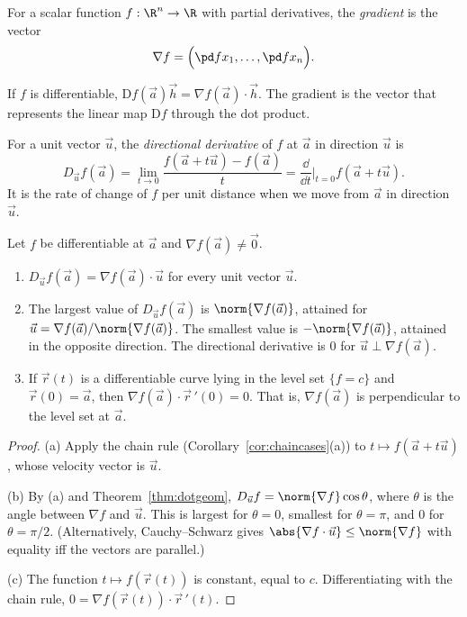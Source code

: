 \begin{definition}[Gradient]
For a scalar function $f:\R^n\to\R$ with partial derivatives, the \emph{gradient} is the vector
\[
\nabla f=\Bigl(\pd f{x_1},\dots,\pd f{x_n}\Bigr).
\]
\end{definition}

If $f$ is differentiable, $\mathrm{D}f(\vec a)\vec h=\nabla f(\vec a)\cdot\vec h$. The gradient is the vector that represents the linear map $\mathrm{D}f$ through the dot product.

\begin{definition}
For a unit vector $\vec u$, the \emph{directional derivative} of $f$ at $\vec a$ in direction $\vec u$ is
\[
D_{\vec u}f(\vec a)=\lim_{t\to0}\frac{f(\vec a+t\vec u)-f(\vec a)}{t}=\frac{\dd}{\dd t}\Big|_{t=0}f(\vec a+t\vec u).
\]
It is the rate of change of $f$ per unit distance when we move from $\vec a$ in direction $\vec u$.
\end{definition}

\begin{theorem}\label{thm:gradprops}
Let $f$ be differentiable at $\vec a$ and $\nabla f(\vec a)\neq\vec 0$.
\begin{enumerate}[label=(\alph*)]
  \item $D_{\vec u}f(\vec a)=\nabla f(\vec a)\cdot\vec u$ for every unit vector $\vec u$.
  \item The largest value of $D_{\vec u}f(\vec a)$ is $\norm{\nabla f(\vec a)}$, attained for $\vec u=\nabla f(\vec a)/\norm{\nabla f(\vec a)}$. The smallest value is $-\norm{\nabla f(\vec a)}$, attained in the opposite direction. The directional derivative is $0$ for $\vec u\perp\nabla f(\vec a)$.
  \item If $\vec r(t)$ is a differentiable curve lying in the level set $\{f=c\}$ and $\vec r(0)=\vec a$, then $\nabla f(\vec a)\cdot\vec r\,'(0)=0$. That is, $\nabla f(\vec a)$ is perpendicular to the level set at $\vec a$.
\end{enumerate}
\end{theorem}

\begin{proof}
(a) Apply the chain rule (Corollary~\ref{cor:chaincases}(a)) to $t\mapsto f(\vec a+t\vec u)$, whose velocity vector is $\vec u$.

(b) By (a) and Theorem~\ref{thm:dotgeom}, $D_{\vec u}f=\norm{\nabla f}\cos\theta$, where $\theta$ is the angle between $\nabla f$ and $\vec u$. This is largest for $\theta=0$, smallest for $\theta=\pi$, and $0$ for $\theta=\pi/2$. (Alternatively, Cauchy--Schwarz gives $\abs{\nabla f\cdot\vec u}\le\norm{\nabla f}$ with equality iff the vectors are parallel.)

(c) The function $t\mapsto f(\vec r(t))$ is constant, equal to $c$. Differentiating with the chain rule, $0=\nabla f(\vec r(t))\cdot\vec r\,'(t)$.
\end{proof}

